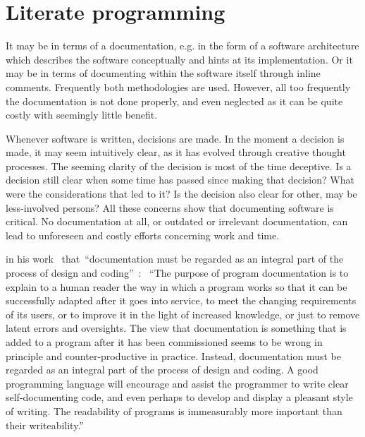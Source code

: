 \documentclass[%
    a4paper,    %
    justified,  %
    nobib,      %
    openany     %
]{tufte-book}
\begin{document}
\section{Literate programming}
\label{sec:literate-programming}

 It may be in terms of
a documentation, e.g. in the form of a software architecture which
describes the software conceptually and hints at its implementation. Or it may
be in terms of documenting within the software itself through inline comments.
Frequently both methodologies are used. However, all too
frequently the documentation is not done properly, and even neglected as it can
be quite costly with seemingly little benefit.

 Whenever software is written,
decisions are made. In the moment a decision is made, it may seem intuitively
clear, as it has evolved through creative thought processes. The seeming clarity
of the decision is most of the time deceptive. Is a decision still clear when
some time has passed since making that decision? What were the considerations
that led to it? Is the decision also clear for other, may be less-involved
persons? All these concerns show that documenting software is critical. No
documentation at all, or outdated or irrelevant documentation, can lead to
unforeseen and costly efforts concerning work and time.

 in his
work~ that~\enquote{documentation must be regarded as
an integral part of the process of design and coding}~\cite[p.
195]{hoare-hpl-1973}: ~\enquote{The purpose of program documentation is to
explain to a human reader the way in which a program works so that it can be
successfully adapted after it goes into service, to meet the changing
requirements of its users, or to improve it in the light of increased knowledge,
or just to remove latent errors and oversights. The view that documentation is
something that is added to a program after it has been commissioned seems to be
wrong in principle and counter-productive in practice. Instead, documentation
must be regarded as an integral part of the process of design and coding. A good
programming language will encourage and assist the programmer to write clear
self-documenting code, and even perhaps to develop and display a pleasant style
of writing. The readability of programs is immeasurably more important than
their writeability.}~\cite[p. 195]{hoare-hpl-1973}
\end{document}
